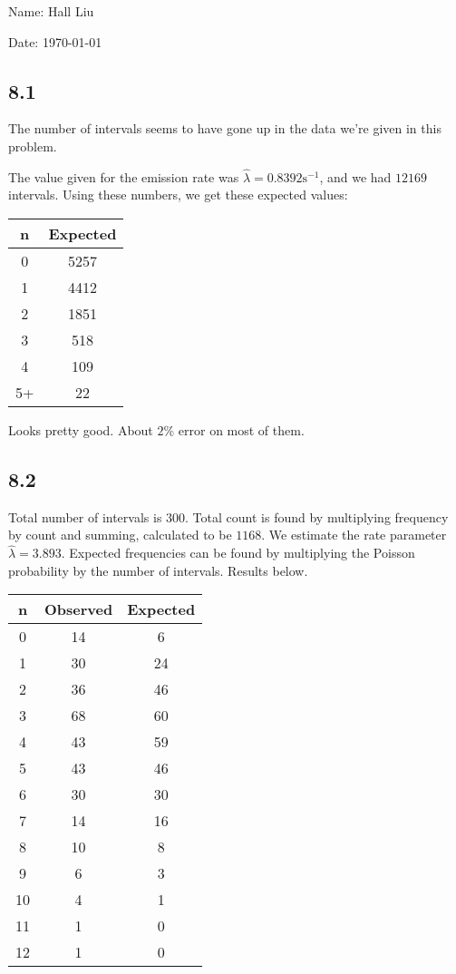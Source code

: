 \documentclass{article}
\begin{document}
Name: Hall Liu

Date: \today 
\vspace{1.5cm}

\subsection*{8.1}
The number of intervals seems to have gone up in the data we're given in this problem. 

The value given for the emission rate was $\hat{\lambda}=0.8392\text{s}^{-1}$, and we had $12169$ intervals. Using these numbers, we get these expected values:

\begin{tabular}{c|c}
n & Expected\\
\hline
0 & 5257\\
1 & 4412\\
2 & 1851\\
3 & 518\\
4 & 109\\
5+ & 22\\
\end{tabular}

Looks pretty good. About $2\%$ error on most of them.

\subsection*{8.2}
Total number of intervals is $300$. Total count is found by multiplying frequency by count and summing, calculated to be $1168$. We estimate the rate parameter $\hat{\lambda}=3.893$. Expected frequencies can be found by multiplying the Poisson probability by the number of intervals. Results below.

\begin{tabular}{c|c|c}
n & Observed & Expected\\
\hline
0 & 14 & 6\\
1 & 30 & 24\\
2 & 36 & 46\\
3 & 68 & 60\\
4 & 43 & 59\\
5 & 43 & 46\\
6 & 30 & 30\\
7 & 14 & 16\\
8 & 10 & 8\\
9 & 6 & 3\\
10 & 4 & 1\\
11 & 1 & 0\\
12 & 1 & 0\\
\end{tabular}
\end{document}
